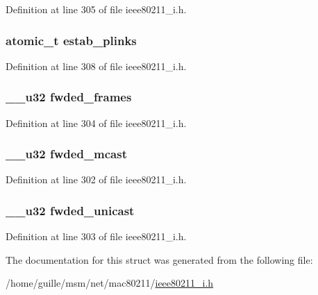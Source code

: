 Definition at line 305 of file ieee80211\-\_\-i.\-h.

\hypertarget{structmesh__stats_a2e422d4c51c64bc57262ef857ee71127}{
\subsubsection[{estab\-\_\-plinks}]{\setlength{\rightskip}{0pt plus 5cm}atomic\-\_\-t estab\-\_\-plinks}}\label{structmesh__stats_a2e422d4c51c64bc57262ef857ee71127}


Definition at line 308 of file ieee80211\-\_\-i.\-h.

\hypertarget{structmesh__stats_a49a415a93a4c3e6864addddb23fd0d48}{
\subsubsection[{fwded\-\_\-frames}]{\setlength{\rightskip}{0pt plus 5cm}\-\_\-\-\_\-u32 fwded\-\_\-frames}}\label{structmesh__stats_a49a415a93a4c3e6864addddb23fd0d48}


Definition at line 304 of file ieee80211\-\_\-i.\-h.

\hypertarget{structmesh__stats_a891b0def69cd36d51778d0688b7f312f}{
\subsubsection[{fwded\-\_\-mcast}]{\setlength{\rightskip}{0pt plus 5cm}\-\_\-\-\_\-u32 fwded\-\_\-mcast}}\label{structmesh__stats_a891b0def69cd36d51778d0688b7f312f}


Definition at line 302 of file ieee80211\-\_\-i.\-h.

\hypertarget{structmesh__stats_a9e49222edd33b4bfe5705350a6d0938c}{
\subsubsection[{fwded\-\_\-unicast}]{\setlength{\rightskip}{0pt plus 5cm}\-\_\-\-\_\-u32 fwded\-\_\-unicast}}\label{structmesh__stats_a9e49222edd33b4bfe5705350a6d0938c}


Definition at line 303 of file ieee80211\-\_\-i.\-h.



The documentation for this struct was generated from the following file\-:\begin{DoxyCompactItemize}
\item 
/home/guille/msm/net/mac80211/\hyperlink{ieee80211__i_8h}{ieee80211\-\_\-i.\-h}\end{DoxyCompactItemize}
